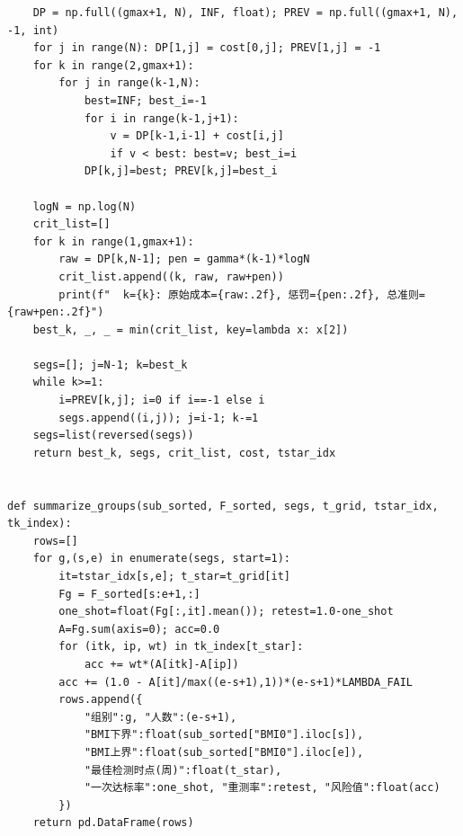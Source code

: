 \begin{lstlisting}
    DP = np.full((gmax+1, N), INF, float); PREV = np.full((gmax+1, N), -1, int)
    for j in range(N): DP[1,j] = cost[0,j]; PREV[1,j] = -1
    for k in range(2,gmax+1):
        for j in range(k-1,N):
            best=INF; best_i=-1
            for i in range(k-1,j+1):
                v = DP[k-1,i-1] + cost[i,j]
                if v < best: best=v; best_i=i
            DP[k,j]=best; PREV[k,j]=best_i

    logN = np.log(N)
    crit_list=[]
    for k in range(1,gmax+1):
        raw = DP[k,N-1]; pen = gamma*(k-1)*logN
        crit_list.append((k, raw, raw+pen))
        print(f"  k={k}: 原始成本={raw:.2f}, 惩罚={pen:.2f}, 总准则={raw+pen:.2f}")
    best_k, _, _ = min(crit_list, key=lambda x: x[2])

    segs=[]; j=N-1; k=best_k
    while k>=1:
        i=PREV[k,j]; i=0 if i==-1 else i
        segs.append((i,j)); j=i-1; k-=1
    segs=list(reversed(segs))
    return best_k, segs, crit_list, cost, tstar_idx


def summarize_groups(sub_sorted, F_sorted, segs, t_grid, tstar_idx, tk_index):
    rows=[]
    for g,(s,e) in enumerate(segs, start=1):
        it=tstar_idx[s,e]; t_star=t_grid[it]
        Fg = F_sorted[s:e+1,:]
        one_shot=float(Fg[:,it].mean()); retest=1.0-one_shot
        A=Fg.sum(axis=0); acc=0.0
        for (itk, ip, wt) in tk_index[t_star]:
            acc += wt*(A[itk]-A[ip])
        acc += (1.0 - A[it]/max((e-s+1),1))*(e-s+1)*LAMBDA_FAIL
        rows.append({
            "组别":g, "人数":(e-s+1),
            "BMI下界":float(sub_sorted["BMI0"].iloc[s]),
            "BMI上界":float(sub_sorted["BMI0"].iloc[e]),
            "最佳检测时点(周)":float(t_star),
            "一次达标率":one_shot, "重测率":retest, "风险值":float(acc)
        })
    return pd.DataFrame(rows)

\end{lstlisting}